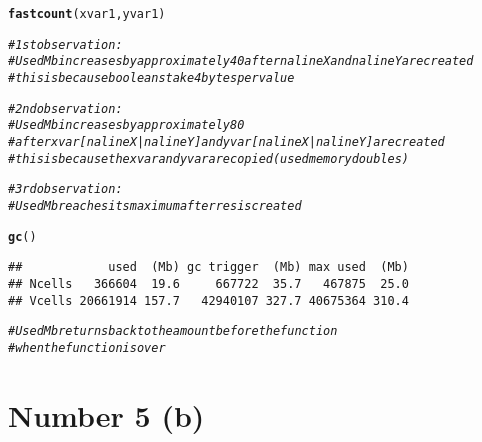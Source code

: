 \documentclass[english]{article}\usepackage[]{graphicx}\usepackage[]{color}
\makeatletter
\newcommand{\hlcom}[1]{\textcolor[rgb]{0.678,0.584,0.686}{\textit{#1}}}%
\newcommand{\hlstd}[1]{\textcolor[rgb]{0.345,0.345,0.345}{#1}}%
\newcommand{\hlkwd}[1]{\textcolor[rgb]{0.737,0.353,0.396}{\textbf{#1}}}%
\newenvironment{kframe}{%
 \def\at@end@of@kframe{}%
 \ifinner\ifhmode%
  \def\at@end@of@kframe{\end{minipage}}%
  \begin{minipage}{\columnwidth}%
 \fi\fi%
 \def\FrameCommand##1{\hskip\@totalleftmargin \hskip-\fboxsep
 \colorbox{shadecolor}{##1}\hskip-\fboxsep
     \hskip-\linewidth \hskip-\@totalleftmargin \hskip\columnwidth}%
 \MakeFramed {\advance\hsize-\width
   \@totalleftmargin\z@ \linewidth\hsize
   \@setminipage}}%
 {\par\unskip\endMakeFramed%
 \at@end@of@kframe}
\newenvironment{knitrout}{}{} %
\makeatother
\begin{document}
\begin{knitrout}
\begin{kframe}
\begin{alltt}
\hlkwd{fastcount}\hlstd{(xvar1,yvar1)}
\end{alltt}


{\ttfamily\noindent\bfseries{}}\begin{alltt}
\hlcom{# 1st observation:}
\hlcom{# Used Mb increases by approximately 40 after nalineX and nalineY are created}
\hlcom{# this is because booleans take 4 bytes per value}

\hlcom{# 2nd observation:}
\hlcom{# Used Mb increases by approximately 80 }
\hlcom{# after xvar[nalineX | nalineY] and yvar[nalineX | nalineY] are created}
\hlcom{# this is because the xvar and yvar are copied (used memory doubles)}

\hlcom{# 3rd observation:}
\hlcom{# Used Mb reaches its maximum after res is created}


\hlkwd{gc}\hlstd{()}
\end{alltt}
\begin{verbatim}
##            used  (Mb) gc trigger  (Mb) max used  (Mb)
## Ncells   366604  19.6     667722  35.7   467875  25.0
## Vcells 20661914 157.7   42940107 327.7 40675364 310.4
\end{verbatim}
\begin{alltt}
\hlcom{# Used Mb returns back to the amount before the function }
\hlcom{# when the function is over}
\end{alltt}
\end{kframe}
\end{knitrout}


\section*{Number 5 (b)}
\end{document}
